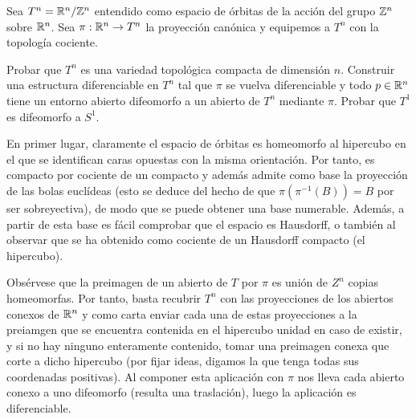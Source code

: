 \documentclass[twoside]{article}
\begin{document}
\begin{ejercicio}{8.4}
Sea $T^n=\mathbb{R}^n/\mathbb{Z}^n$ entendido como espacio de órbitas de la acción del grupo $\mathbb{Z}^n$ sobre $\mathbb{R}^n$. Sea $\pi:\mathbb{R}^n\to T^n$ la proyección canónica y equipemos a $T^n$ con la topología cociente.

Probar que $T^n$ es una variedad topológica compacta de dimensión $n$. Construir una estructura diferenciable en $T^n$ tal que $\pi$ se vuelva diferenciable y todo $p\in \mathbb{R}^n$ tiene un entorno abierto difeomorfo a un abierto de $T^n$ mediante $\pi$. Probar que $T^1$ es difeomorfo a $S^1$.  
\end{ejercicio}
\begin{solucion}
En primer lugar, claramente el espacio de órbitas es homeomorfo al hipercubo en el que se identifican caras opuestas con la misma orientación. Por tanto, es compacto por cociente de un compacto y además admite como base la proyección de las bolas euclídeas (esto se deduce del hecho de que $\pi(\pi^{-1}(B))=B$ por ser sobreyectiva), de modo que se puede obtener una base numerable. Además, a partir de esta base es fácil comprobar que el espacio es Hausdorff, o también al observar que se ha obtenido como cociente de un Hausdorff compacto (el hipercubo).

Obsérvese que la preimagen de un abierto de $T$ por $\pi$ es unión de $Z^n$ copias homeomorfas. Por tanto, basta recubrir $T^n$ con las proyecciones de los abiertos conexos de $\mathbb{R}^n$ y como carta enviar cada una de estas proyecciones a la preiamgen que se encuentra contenida en el hipercubo unidad en caso de existir, y si no hay ninguno enteramente contenido, tomar una preimagen conexa que corte a dicho hipercubo (por fijar ideas, digamos la que tenga todas sus coordenadas positivas). Al componer esta aplicación con $\pi$ nos lleva cada abierto conexo a uno difeomorfo (resulta una traslación), luego la aplicación es diferenciable. 
\end{solucion}

\newpage
\end{document}
